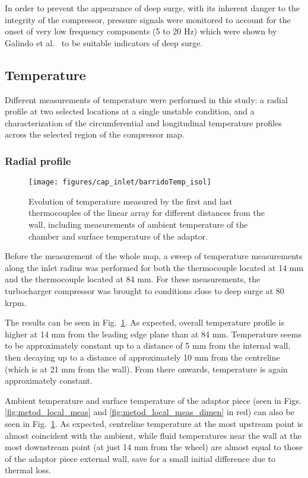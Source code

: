In order to prevent the appearance of deep surge, with its inherent danger to the integrity of the compressor, pressure signals were monitored to account for the onset of very low frequency components (5 to 20 Hz) which were shown by Galindo et al.~\cite{galindo2013engine} to be suitable indicators of deep surge.

\subsection{Temperature}
\label{sub:temperature}

Different measurements of temperature were performed in this study: a radial profile at two selected locations at a single unstable condition, and a characterization of the circumferential and longitudinal temperature profiles across the selected region of the compressor map.

\subsubsection{Radial profile}

\begin{figure}[b!]
\centering
\texttt{[image: figures/cap\_inlet/barridoTemp\_isol]}
\caption[Radial temperature distributions]{Evolution of temperature measured by the first and last thermocouples of the linear array for different distances from the wall, including measurements of ambient temperature of the chamber and surface temperature of the adaptor.}
\label{fig:barrido_temp}
\end{figure}

Before the measurement of the whole map, a sweep of temperature measurements along the inlet radius was performed for both the thermocouple located at 14 mm and the thermocouple located at 84 mm. For these measurements, the turbocharger compressor was brought to conditions close to deep surge at 80 krpm.

The results can be seen in Fig.~\ref{fig:barrido_temp}. As expected, overall temperature profile is higher at 14 mm from the leading edge plane than at 84 mm. Temperature seems to be approximately constant up to a distance of 5 mm from the internal wall, then decaying up to a distance of approximately 10 mm from the centreline (which is at 21 mm from the wall). From there onwards, temperature is again approximately constant.

Ambient temperature and surface temperature of the adaptor piece (seen in Figs. \ref{fig:metod_local_meas} and \ref{fig:metod_local_meas_dimen} in red) can also be seen in Fig.~\ref{fig:barrido_temp}. As expected, centreline temperature at the most upstream point is almost coincident with the ambient, while fluid temperatures near the wall at the most downstream point (at just 14 mm from the wheel) are almost equal to those of the adaptor piece external wall, save for a small initial difference due to thermal loss.

